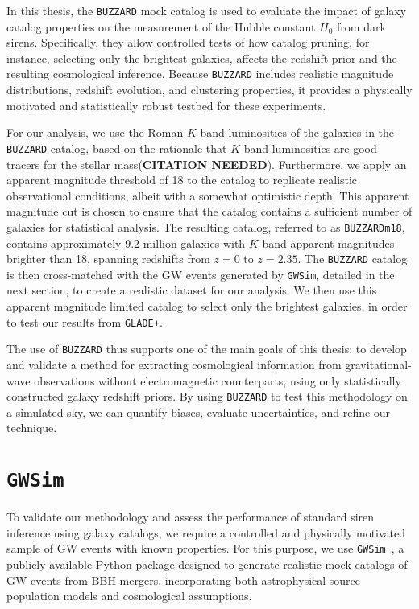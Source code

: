 In this thesis, the \texttt{BUZZARD} mock catalog is used to evaluate the impact of galaxy catalog properties on the measurement of the Hubble constant $H_0$ from dark sirens. Specifically, they allow controlled tests of how catalog pruning, for instance, selecting only the brightest galaxies, affects the redshift prior and the resulting cosmological inference. Because \texttt{BUZZARD} includes realistic magnitude distributions, redshift evolution, and clustering properties, it provides a physically motivated and statistically robust testbed for these experiments.

For our analysis, we use the Roman $K$-band luminosities of the galaxies in the \texttt{BUZZARD} catalog, based on the rationale that $K$-band luminosities are good tracers for the stellar mass(\textbf{CITATION NEEDED}). Furthermore, we apply an apparent magnitude threshold of 18 to the catalog to replicate realistic observational conditions, albeit with a somewhat optimistic depth. This apparent magnitude cut is chosen to ensure that the catalog contains a sufficient number of galaxies for statistical analysis. The resulting catalog, referred to as \texttt{BUZZARDm18}, contains approximately 9.2 million galaxies with $K$-band apparent magnitudes brighter than 18, spanning redshifts from $z=0$ to $z=2.35$. The \texttt{BUZZARD} catalog is then cross-matched with the \ac{GW} events generated by \texttt{GWSim}, detailed in the next section, to create a realistic dataset for our analysis. We then use this apparent magnitude limited catalog to select only the brightest galaxies, in order to test our results from \texttt{GLADE+}.

The use of \texttt{BUZZARD} thus supports one of the main goals of this thesis: to develop and validate a method for extracting cosmological information from gravitational-wave observations without electromagnetic counterparts, using only statistically constructed galaxy redshift priors. By using \texttt{BUZZARD} to test this methodology on a simulated sky, we can quantify biases, evaluate uncertainties, and refine our technique.

\section{\texttt{GWSim}}
To validate our methodology and assess the performance of standard siren inference using galaxy catalogs, we require a controlled and physically motivated sample of \ac{GW} events with known properties. For this purpose, we use \texttt{\texttt{GWSim}}~\citep{karathanasis2023gwsim}, a publicly available Python package designed to generate realistic mock catalogs of GW events from \ac{BBH} mergers, incorporating both astrophysical source population models and cosmological assumptions.

